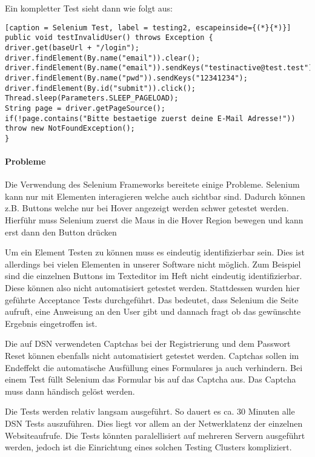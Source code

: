 Ein kompletter Test sieht dann wie folgt aus:
\begin{lstlisting}[caption = Selenium Test, label = testing2, escapeinside={(*}{*)}]
public void testInvalidUser() throws Exception {
driver.get(baseUrl + "/login");
driver.findElement(By.name("email")).clear();
driver.findElement(By.name("email")).sendKeys("testinactive@test.test");
driver.findElement(By.name("pwd")).sendKeys("12341234");
driver.findElement(By.id("submit")).click();
Thread.sleep(Parameters.SLEEP_PAGELOAD);
String page = driver.getPageSource();
if(!page.contains("Bitte bestaetige zuerst deine E-Mail Adresse!")) throw new NotFoundException();
}
\end{lstlisting}

\paragraph{Probleme}
Die Verwendung des Selenium Frameworks bereitete einige Probleme. Selenium kann nur mit Elementen interagieren welche auch sichtbar sind. Dadurch können z.B. Buttons welche nur bei Hover angezeigt werden schwer getestet werden. Hierführ muss Selenium zuerst die Maus in die Hover Region bewegen und kann erst dann den Button drücken 

Um ein Element Testen zu können muss es eindeutig identifizierbar sein. Dies ist allerdings bei vielen Elementen in unserer Software nicht möglich. Zum Beispiel sind die einzelnen Buttons im Texteditor im Heft nicht eindeutig identifizierbar. Diese können also nicht automatisiert getestet werden. Stattdessen wurden hier geführte Acceptance Tests durchgeführt. Das bedeutet, dass Selenium die Seite aufruft, eine Anweisung an den User gibt und dannach fragt ob das gewünschte Ergebnis eingetroffen ist. 

Die auf DSN verwendeten Captchas bei der Registrierung und dem Passwort Reset können ebenfalls nicht automatisiert getestet werden. Captchas sollen im Endeffekt die automatische Ausfüllung eines Formulares ja auch verhindern. Bei einem Test füllt Selenium das Formular bis auf das Captcha aus. Das Captcha muss dann händisch gelöst werden. 

Die Tests werden relativ langsam ausgeführt. So dauert es ca. 30 Minuten alle DSN Tests auszuführen. Dies liegt vor allem an der Netwerklatenz der einzelnen Websiteaufrufe. Die Tests könnten paralellisiert auf mehreren Servern ausgeführt werden, jedoch ist die Einrichtung eines solchen Testing Clusters kompliziert.
